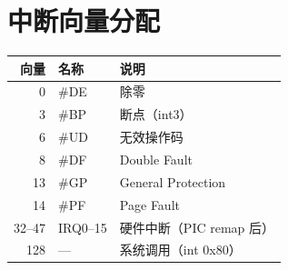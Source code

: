 \section{中断向量分配}

\begin{longtable}{rll}
  \toprule
  \textbf{向量} & \textbf{名称} & \textbf{说明} \\
  \midrule
  0   & \#DE & 除零 \\
  3   & \#BP & 断点（int3） \\
  6   & \#UD & 无效操作码 \\
  8   & \#DF & Double Fault \\
  13  & \#GP & General Protection \\
  14  & \#PF & Page Fault \\
  32--47 & IRQ0--15 & 硬件中断（PIC remap 后） \\
  128 & --- & 系统调用（int 0x80） \\
  \bottomrule
\end{longtable}
